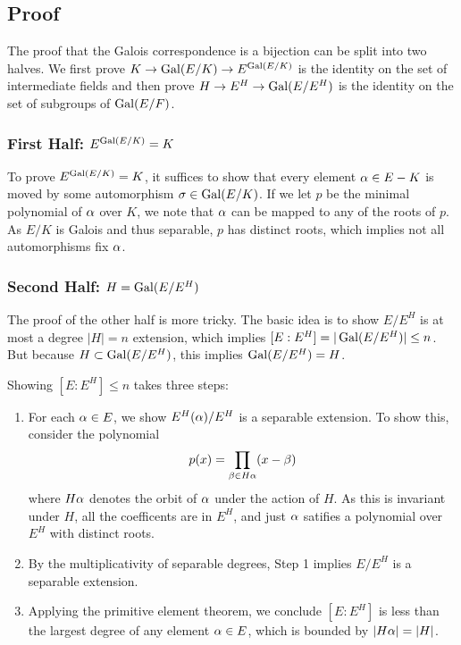 \subsection{Proof}
The proof that the Galois correspondence is a bijection can be split into two halves. We first prove $K \rightarrow \operatorname{Gal}(E/K) \rightarrow E^{\operatorname{Gal}(E/K)}$ is the identity on the set of intermediate fields and then prove $H \rightarrow E^H \rightarrow \operatorname{Gal}(E/E^H)$ is the identity on the set of subgroups of $\operatorname{Gal}(E/F)$.

\subsubsection{First Half: $E^{\operatorname{Gal}(E/K)} = K$}
To prove $E^{\operatorname{Gal}(E/K)} = K$, it suffices to show that every element $\alpha \in E-K$ is moved by some automorphism $\sigma \in \operatorname{Gal}(E/K)$. If we let $p$ be the minimal polynomial of $\alpha$ over $K$, we note that $\alpha$ can be mapped to any of the roots of $p$. As $E/K$ is Galois and thus separable, $p$ has distinct roots, which implies not all automorphisms fix $\alpha$.

\subsubsection{Second Half: $H = \operatorname{Gal}(E/E^H)$}
The proof of the other half is more tricky. The basic idea is to show $E/E^H$ is at most a degree $|H| = n$ extension, which implies $[E : E^H] = |\operatorname{Gal}(E/E^H)| \leq n$. But because $H \subset \operatorname{Gal}(E/E^H)$, this implies $\operatorname{Gal}(E/E^H) = H$.

Showing $[E : E^H] \leq n$ takes three steps:
\begin{enumerate}
    \item For each $\alpha \in E$, we show $E^H(\alpha)/E^H$ is a separable extension. To show this, consider the polynomial
        \[
            p(x) = \prod_{\beta \in H\alpha} (x - \beta)
        \]
        where $H\alpha$ denotes the orbit of $\alpha$ under the action of $H$. As this is invariant under $H$, all the coefficents are in $E^H$, and just $\alpha$ satifies a polynomial over $E^H$ with distinct roots.
    \item By the multiplicativity of separable degrees, Step 1 implies $E/E^H$ is a separable extension.
    \item Applying the primitive element theorem, we conclude $[E : E^H]$ is less than the largest degree of any element $\alpha \in E$, which is bounded by $|H\alpha| = |H|$.
\end{enumerate}

